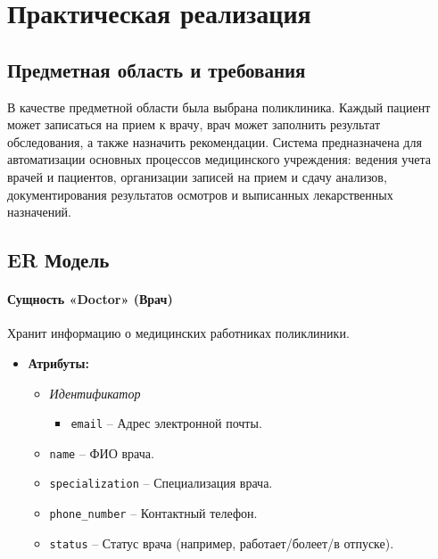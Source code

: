 \documentclass[a4paper, 14pt]{extarticle}
\begin{document}
\section*{Практическая реализация}\label{Sect::implementation}

\subsection*{Предметная область и требования}
В качестве предметной области была выбрана поликлиника. Каждый пациент может записаться на прием к врачу, врач может заполнить результат обследования, а также назначить рекомендации. Система предназначена для автоматизации основных процессов медицинского учреждения: ведения учета врачей и пациентов, организации записей на прием и сдачу анализов, документирования результатов осмотров и выписанных лекарственных назначений.

\subsection*{ER Модель}

\paragraph{Сущность «Doctor» (Врач)}
Хранит информацию о медицинских работниках поликлиники.
\begin{itemize}
    \item \textbf{Атрибуты:}
    \begin{itemize}
        \item \textit{Идентификатор}
            \begin{itemize}
                \item \texttt{email} – Адрес электронной почты.
            \end{itemize}

        \item \texttt{name} – ФИО врача.
        \item \texttt{specialization} – Специализация врача.
        \item \texttt{phone\_number} – Контактный телефон.
        \item \texttt{status} – Статус врача (например, работает/болеет/в отпуске).
    \end{itemize}
\end{itemize}
\end{document}
